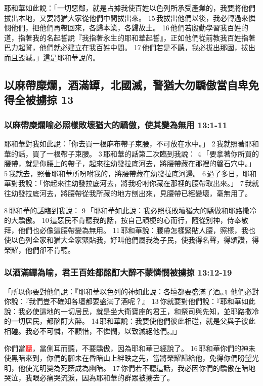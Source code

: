 耶和華如此說：「一切惡鄰，就是占據我使百姓以色列所承受產業的，我要將他們拔出本地，又要將猶大家從他們中間拔出來。 15 我拔出他們以後，我必轉過來憐憫他們，把他們再帶回來，各歸本業，各歸故土。 16 他們若殷勤學習我百姓的道，指著我的名起誓說『我指著永生的耶和華起誓』，正如他們從前教我百姓指著巴力起誓，他們就必建立在我百姓中間。 17 他們若是不聽，我必拔出那國，拔出而且毀滅。」這是耶和華說的。

\subsection{以麻帶糜爛，酒滿罈，北國滅，警猶大勿驕傲當自卑免得全被擄掠 13}
\subsubsection{以麻帶糜爛喻必照樣敗壞猶大的驕傲，使其變為無用 13:1-11}
耶和華對我如此說：「你去買一根麻布帶子束腰，不可放在水中。」 2 我就照著耶和華的話，買了一根帶子束腰。 3 耶和華的話第二次臨到我說： 4 「要拿著你所買的腰帶，就是你腰上的帶子，起來往幼發拉底河去，將腰帶藏在那裡的磐石穴中。」 5 我就去，照著耶和華所吩咐我的，將腰帶藏在幼發拉底河邊。 6 過了多日，耶和華對我說：「你起來往幼發拉底河去，將我吩咐你藏在那裡的腰帶取出來。」 7 我就往幼發拉底河去，將腰帶從我所藏的地方刨出來，見腰帶已經變壞，毫無用了。

8 耶和華的話臨到我說： 9 「耶和華如此說：我必照樣敗壞猶大的驕傲和耶路撒冷的大驕傲。 10 這惡民不肯聽我的話，按自己頑梗的心而行，隨從別神，侍奉敬拜，他們也必像這腰帶變為無用。 11 耶和華說：腰帶怎樣緊貼人腰，照樣，我也使以色列全家和猶大全家緊貼我，好叫他們屬我為子民，使我得名聲，得頌讚，得榮耀，他們卻不肯聽。

\subsubsection{以酒滿罈為喻，君王百姓都酩酊大醉不蒙憐憫被擄掠 13:12-19}
「所以你要對他們說：『耶和華以色列的神如此說：各壇都要盛滿了酒。』他們必對你說：『我們豈不確知各壇都要盛滿了酒呢？』 13 你就要對他們說：『耶和華如此說：我必使這地的一切居民，就是坐大衛寶座的君王，和祭司與先知，並耶路撒冷的一切居民，都酩酊大醉。 14 耶和華說：我要使他們彼此相碰，就是父與子彼此相碰。我必不可憐，不顧惜，不憐憫，以致滅絕他們。』」

你們當\textcolor{red}{聽}，當側耳而聽，不要驕傲，因為耶和華已經說了。 16 耶和華你們的神未使黑暗來到，你們的腳未在昏暗山上絆跌之先，當將榮耀歸給他，免得你們盼望光明，他使光明變為死蔭成為幽暗。 17 你們若不聽這話，我必因你們的驕傲在暗地哭泣，我眼必痛哭流淚，因為耶和華的群眾被擄去了。


